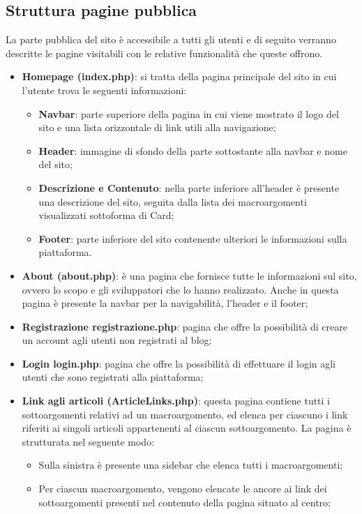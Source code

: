 \documentclass[12pt]{article}
\begin{document}
	\subsection{Struttura pagine pubblica}
		La parte pubblica del sito è accessibile a tutti gli utenti e di seguito verranno descritte le pagine visitabili con le relative funzionalità che queste offrono.
		\begin{itemize}
				\item \textbf{Homepage (index.php)}: si tratta della pagina principale del sito in cui l'utente trova le seguenti informazioni:
				\begin{itemize}
						\item \textbf{Navbar}: parte superiore della pagina in cui viene mostrato il logo del sito e una lista orizzontale di link utili alla navigazione;
						\item \textbf{Header}: immagine di sfondo della parte sottostante alla navbar e nome del sito;
						\item \textbf{Descrizione e Contenuto}: nella parte inferiore all'header è presente una descrizione del sito, seguita dalla lista dei macroargomenti visualizzati sottoforma di Card;
						\item \textbf{Footer}: parte inferiore del sito contenente ulteriori le informazioni sulla piattaforma.
				\end{itemize}
			\item \textbf{About (about.php)}: è una pagina che fornisce tutte le informazioni sul sito, ovvero lo scopo e gli sviluppatori che lo hanno realizzato. Anche in questa pagina è presente la navbar per la navigabilità, l'header e il footer;
			\item \textbf{Registrazione {registrazione.php}}: pagina che offre la possibilità di creare un account agli utenti non registrati al blog;
			\item \textbf{Login {login.php}}: pagina che offre la possibilità di effettuare il login agli utenti che sono registrati alla piattaforma;
			\item \textbf{Link agli articoli (ArticleLinks.php)}: questa pagina contiene tutti i sottoargomenti relativi ad un macroargomento, ed elenca per ciascuno i link riferiti ai singoli articoli appartenenti al ciascun sottoargomento. La pagina è strutturata nel seguente modo:
				\begin{itemize}
					\item Sulla sinistra è presente una sidebar che elenca tutti i macroargomenti;
					\item Per ciascun macroargomento, vengono elencate le ancore ai link dei sottoargomenti presenti nel contenuto della pagina situato al centro;

\end{itemize}
\end{itemize}
\end{document}
